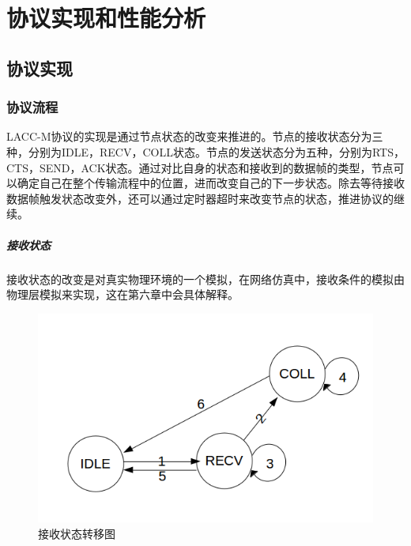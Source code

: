 \chapter{协议实现和性能分析}
\section {协议实现}
\subsection{协议流程}
LACC-M协议的实现是通过节点状态的改变来推进的。节点的接收状态分为三种，分别为IDLE，RECV，COLL状态。节点的发送状态分为五种，分别为RTS，CTS，SEND，ACK状态。通过对比自身的状态和接收到的数据帧的类型，节点可以确定自己在整个传输流程中的位置，进而改变自己的下一步状态。除去等待接收数据帧触发状态改变外，还可以通过定时器超时来改变节点的状态，推进协议的继续。
\paragraph{接收状态}
接收状态的改变是对真实物理环境的一个模拟，在网络仿真中，接收条件的模拟由物理层模拟来实现，这在第六章中会具体解释。
 \begin{figure}[!ht]
 	\centering
 	\includegraphics[scale=0.4]{figures/rxstate.png}
 	\caption{
 		接收状态转移图
 	}
 	\label{fig:example}
 \end{figure}
 
